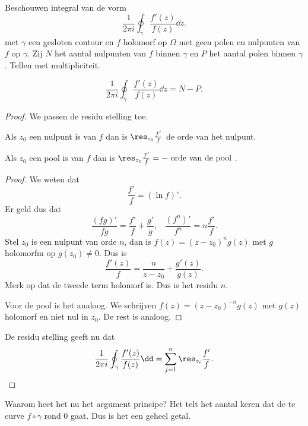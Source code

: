 Beschouwen integral van de vorm 
\[
	\frac{1}{2 \pi i} \oint_{\gamma} \frac{f'(z)}{f(z)} \dd z
.\] 
met $\gamma$ een gesloten contour en $f$ holomorf op $\Omega$ met geen polen en nulpunten van $f$ op $\gamma$. 
Zij $N$ het aantal nulpunten van $f$ binnen $\gamma$ en $P $ het aantal polen binnen $\gamma$. Tellen met multipliciteit.
\begin{stelling}
	[argumentprincipe]
\[
	\frac{1}{2 \pi i} \oint_{\gamma} \frac{f'(z)}{f(z)} \dd z = N - P
.\] 	
\end{stelling}
\begin{proof}
	We passen de residu stelling toe. 
	\begin{lemma}
		Als $z_0$ een nulpunt is van $f$ dan is $\res_{z_0} \frac{f'}{f}$ de orde van het nulpunt.

		Als $z_0$ een pool is van $f$ dan is $\res_{z_0} \frac{f'}{f} = - \text{ orde van de pool }$.
	\end{lemma}
	\begin{proof}
		We weten dat \[
			\frac{f'}{f} = \left( \ln f \right) '
		.\] 	
		Er geld dus dat \[
			\frac{\left( fg \right) '}{fg } = \frac{f'}{f} + \frac{g'}{g}, \;\;\; \frac{(f^{n})'}{f^{n}} =  n \frac{f'}{f}
		.\] 
		Stel $z_0$ is een nulpunt van  orde $n$, dan is $f(z) = (z - z_0)^{n}g(z)$ met $g$ holomorfm op $g(z_0) \ne 0$. 
		Dus is \[
			\frac{f'(z)}{f} = \frac{n}{z-z_0} + \frac{g'(z)}{g(z)}
		.\] 
		Merk op dat de tweede term holomorf is. Dus is het residu $n$. 


		Voor de pool is het analoog. 
		We schrijven $f(z) = (z - z_0)^{-n}g(z)$ met $g(z)$ holomorf en niet nul in $z_0$. De rest is analoog.
	\end{proof}

	De residu stelling geeft nu dat 
	\[
		\frac{1}{2 \pi i }\oint _{\gamma} \frac{f'(z)}{f(z)} \dd  = \sum_{j = 1}^{n} \res_{z_i} \frac{f'}{f}
	.\] 
\end{proof}
Waarom heet het nu het argument principe?
 Het telt het aantal keren dat de te curve $f\circ \gamma$ rond 0 gaat. Dus is het een geheel getal. 

